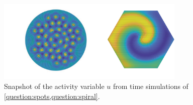 \documentclass[a4paper]{siamonline220329}
\theoremstyle{plain}
\begin{document}
\begin{figure}
  \centering
  \includegraphics[width = 0.8\textwidth]{patterns}
  \caption{Snapshot of the activity variable $u$ from time simulations of
  \cref{question:spots,question:spiral}.}
  \label{fig:patterns}
\end{figure}
  
\end{document}
